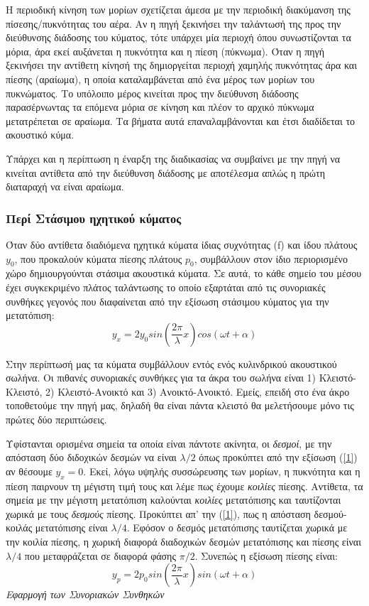 \documentclass[a4paper]{article}
\begin{document}

Η περιοδική κίνηση των μορίων σχετίζεται άμεσα με την περιοδική διακύμανση της πίσεσης/πυκνότητας του αέρα. Αν η πηγή ξεκινήσει την ταλάντωσή της προς την διεύθυνσης διάδοσης του κύματος, τότε υπάρχει μία περιοχή όπου συνωστίζονται τα μόρια, άρα εκεί αυξάνεται η πυκνότητα και η πίεση (πύκνωμα). Όταν η πηγή ξεκινήσει την αντίθετη κίνησή της δημιοργείται περιοχή χαμηλής πυκνότητας άρα και πίεσης (αραίωμα), η οποία καταλαμβάνεται από ένα μέρος των μορίων του πυκνώματος. Το υπόλοιπο μέρος κινείται προς την διεύθυνση διάδοσης παρασέρνωντας τα επόμενα μόρια σε κίνηση και πλέον το αρχικό πύκνωμα μετατρέπεται σε αραίωμα. Τα βήματα αυτά επαναλαμβάνονται και έτσι διαδίδεται το ακουστικό κύμα. 

Υπάρχει και η περίπτωση η έναρξη της διαδικασίας να συμβαίνει με την πηγή να κινείται αντίθετα από την διεύθυνση διάδοσης με αποτέλεσμα απλώς η πρώτη διαταραχή να είναι αραίωμα.


\subsubsection*{Περί Στάσιμου ηχητικού κύματος}
Όταν δύο αντίθετα διαδιόμενα ηχητικά κύματα ίδιας συχνότητας (f) και ίδου πλάτους $y_0$, που προκαλούν κύματα πίεσης πλάτους $p_0$, συμβάλλουν στον ίδιο περιορισμένο χώρο δημιουργούνται στάσιμα ακουστικά κύματα. Σε αυτά, το κάθε σημείο του μέσου έχει συγκεκριμένο πλάτος ταλάντωσης το οποίο εξαρτάται από τις συνοριακές συνθήκες γεγονός που διαφαίνεται από την εξίσωση στάσιμου κύματος για την μετατόπιση: 
\begin{equation}\label{1}
y_x  =  2y_0 sin(\frac{2\pi}{\lambda}x)cos(\omega t+\alpha) 
\end{equation}

Στην περίπτωσή μας τα κύματα συμβάλλουν εντός ενός κυλινδρικού ακουστικού σωλήνα. Οι πιθανές συνοριακές συνθήκες για τα άκρα του σωλήνα είναι 1) Κλειστό-Κλειστό, 2) Κλειστό-Ανοικτό και 3) Ανοικτό-Ανοικτό. Εμείς, επειδή στο ένα άκρο τοποθετούμε την πηγή μας, δηλαδή θα είναι πάντα κλειστό θα μελετήσουμε μόνο τις πρώτες δύο περιπτώσεις.

Υφίστανται ορισμένα σημεία τα οποία είναι πάντοτε ακίνητα, οι \textit{δεσμοί}, με την απόσταση δύο διδοχικών δεσμών να είναι $\lambda/2$ όπως προκύπτει από την εξίσωση (\ref{1}) αν θέσουμε $y_x=0$. Εκεί, λόγω υψηλής συσσώρευσης των μορίων, η πυκνότητα και η πίεση παιρνουν τη μέγιστη τιμή τους και λέμε πως έχουμε \textit{κοιλίες} πίεσης. Αντίθετα, τα σημεία με την μέγιστη μετατόπιση καλούνται \textit{κοιλίες} μετατόπισης και ταυτίζονται χωρικά με τους \textit{δεσμούς} πίεσης. Προκύπτει απ' την (\ref{1}), πως η απόσταση δεσμού-κοιλάς μετατόπισης είναι $\lambda/4$. Εφόσον ο δεσμός μετατόπισης ταυτίζεται χωρικά με την κοιλία πίεσης, η χωρική διαφορά διαδοχικών δεσμών μετατόπισης και πίεσης είναι $\lambda/4$ που μεταφράζεται σε διαφορά φάσης $\pi/2$. Συνεπώς η εξίσωση πίεσης είναι: 
\begin{equation}\label{2}
y_p  =  2p_0 sin(\frac{2\pi}{\lambda}x)sin(\omega t+\alpha) 
\end{equation}
\textit{Εφαρμογή των Συνοριακών Συνθηκών}\\
\end{document}
